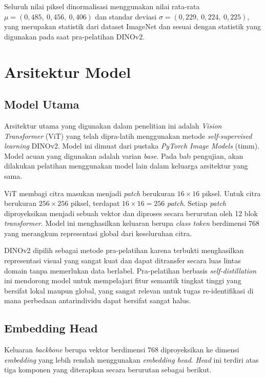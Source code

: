 Seluruh nilai piksel dinormalisasi menggunakan nilai rata-rata $\mu = (0{,}485,\ 0{,}456,\ 0{,}406)$ dan standar deviasi $\sigma = (0{,}229,\ 0{,}224,\ 0{,}225)$, yang merupakan statistik dari dataset ImageNet dan sesuai dengan statistik yang digunakan pada saat pra-pelatihan DINOv2.

\section{Arsitektur Model}

\subsection{Model Utama}

Arsitektur utama yang digunakan dalam penelitian ini adalah \textit{Vision Transformer} (ViT) yang telah dipra-latih menggunakan metode \textit{self-supervised learning} DINOv2. Model ini dimuat dari pustaka \textit{PyTorch Image Models} (timm). Model acuan yang digunakan adalah varian \textit{base}. Pada bab pengujian, akan dilakukan pelatihan menggunakan model lain dalam keluarga arsitektur yang sama.

ViT membagi citra masukan menjadi \textit{patch} berukuran $16 \times 16$ piksel. Untuk citra berukuran $256 \times 256$ piksel, terdapat $16 \times 16 = 256$ \textit{patch}. Setiap \textit{patch} diproyeksikan menjadi sebuah vektor dan diproses secara berurutan oleh 12 blok \textit{transformer}. Model ini menghasilkan keluaran berupa \textit{class token} berdimensi 768 yang merangkum representasi global dari keseluruhan citra.

DINOv2 dipilih sebagai metode pra-pelatihan karena terbukti menghasilkan representasi visual yang sangat kuat dan dapat ditransfer secara luas lintas domain tanpa memerlukan data berlabel. Pra-pelatihan berbasis \textit{self-distillation} ini mendorong model untuk mempelajari fitur semantik tingkat tinggi yang bersifat lokal maupun global, yang sangat relevan untuk tugas re-identifikasi di mana perbedaan antarindividu dapat bersifat sangat halus.

\subsection{Embedding Head}

Keluaran \textit{backbone} berupa vektor berdimensi 768 diproyeksikan ke dimensi \textit{embedding} yang lebih rendah menggunakan \textit{embedding head}. \textit{Head} ini terdiri atas tiga komponen yang diterapkan secara berurutan sebagai berikut.

